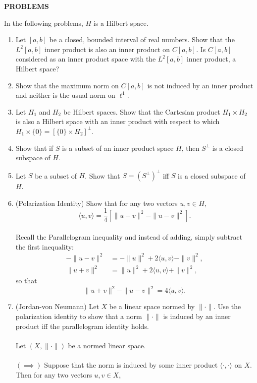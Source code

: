 \begin{center}
	\textbf{PROBLEMS}
\end{center}
In the following problems, $H$ is a Hilbert space.
\begin{enumerate}
	\setcounter{enumi}{0}
    \item Let $[a,b]$ be a closed, bounded interval of real numbers. Show that the $L^2[a,b]$ inner product is also an inner product on $C[a,b]$. Is $C[a,b]$ considered as an inner product space with the $L^2[a,b]$ inner product, a Hilbert space?
    \item Show that the maximum norm on $C[a,b]$ is not induced by an inner product and neither is the usual norm on $\ell^1$.
    \item Let $H_1$ and $H_2$ be Hilbert spaces. Show that the Cartesian product $H_1\times H_2$ is also a Hilbert space with an inner product with respect to which $H_1\times\{0\}=[\{0\}\times H_2]^\perp$.
    \item Show that if $S$ is a subset of an inner product space $H$, then $S^\perp$ is a closed subspace of $H$.
    \item Let $S$ be a subset of $H$. Show that $S=(S^\perp)^\perp$ iff $S$ is a closed subspace of $H$.
    \item (Polarization Identity) Show that for any two vectors $u,v\in H$,
    \[
        \langle u,v \rangle = \frac{1}{4}[\|u+v\|^2-\|u-v\|^2].
    \]
    \\Recall the Parallelogram inequality and instead of adding, simply subtract the first inequality:
    \begin{align*}
        -\|u-v\|^2&=-\|u\|^2+2\langle u,v\rangle-\|v\|^2,\\
        \|u+v\|^2&=\|u\|^2+2\langle u,v\rangle+\|v\|^2,
    \end{align*}
    so that
    \[
        \|u+v\|^2-\|u-v\|^2=4\langle u,v\rangle.
    \]
    \item (Jordan-von Neumann) Let $X$ be a linear space normed by $\|\cdot\|$. Use the polarization identity to show that a norm $\|\cdot\|$ is induced by an inner product iff the parallelogram identity holds.\\
    \\Let $(X,\|\cdot\|)$ be a normed linear space.\\
    \\$(\implies)$ Suppose that the norm is induced by some inner product $\langle \cdot,\cdot\rangle$ on $X$.
    \\Then for any two vectors $u,v\in X$,

\end{enumerate}
